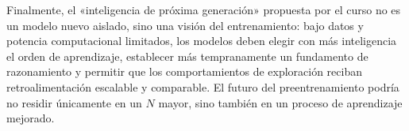 \documentclass[a4paper]{article}
\begin{document}
Finalmente, el «inteligencia de próxima generación» propuesta por el curso no es un modelo nuevo aislado, sino una visión del entrenamiento: bajo datos y potencia computacional limitados, los modelos deben elegir con más inteligencia el orden de aprendizaje, establecer más tempranamente un fundamento de razonamiento y permitir que los comportamientos de exploración reciban retroalimentación escalable y comparable. El futuro del preentrenamiento podría no residir únicamente en un $N$ mayor, sino también en un proceso de aprendizaje mejorado.
\end{document}
